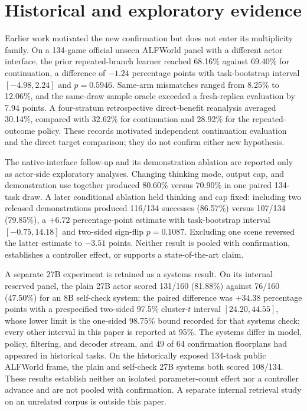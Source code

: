 









\section{Historical and exploratory evidence}
\label{app:historical}

Earlier work motivated the new confirmation but does not enter its multiplicity family. On a 134-game official unseen ALFWorld panel with a different actor interface, the prior repeated-branch learner reached 68.16\% against 69.40\% for continuation, a difference of $-1.24$ percentage points with task-bootstrap interval $[-4.98,2.24]$ and $p=0.5946$. Same-arm mismatches ranged from 8.25\% to 12.06\%, and the same-draw sample oracle exceeded a fresh-replica evaluation by 7.94 points. A four-stratum retrospective direct-benefit reanalysis averaged 30.14\%, compared with 32.62\% for continuation and 28.92\% for the repeated-outcome policy. These records motivated independent continuation evaluation and the direct target comparison; they do not confirm either new hypothesis.

The native-interface follow-up and its demonstration ablation are reported only as actor-side exploratory analyses. Changing thinking mode, output cap, and demonstration use together produced 80.60\% versus 70.90\% in one paired 134-task draw. A later conditional ablation held thinking and cap fixed: including two released demonstrations produced 116/134 successes (86.57\%) versus 107/134 (79.85\%), a $+6.72$ percentage-point estimate with task-bootstrap interval $[-0.75,14.18]$ and two-sided sign-flip $p=0.1087$. Excluding one scene reversed the latter estimate to $-3.51$ points. Neither result is pooled with confirmation, establishes a controller effect, or supports a state-of-the-art claim.

A separate 27B experiment is retained as a systems result. On its internal reserved panel, the plain 27B actor scored 131/160 (81.88\%) against 76/160 (47.50\%) for an 8B self-check system; the paired difference was $+34.38$ percentage points with a prespecified two-sided 97.5\% cluster-$t$ interval $[24.20,44.55]$, whose lower limit is the one-sided 98.75\% bound recorded for that systems check; every other interval in this paper is reported at 95\%. The systems differ in model, policy, filtering, and decoder stream, and 49 of 64 confirmation floorplans had appeared in historical tasks. On the historically exposed 134-task public ALFWorld frame, the plain and self-check 27B systems both scored 108/134. These results establish neither an isolated parameter-count effect nor a controller advance and are not pooled with confirmation. A separate internal retrieval study on an unrelated corpus is outside this paper.

